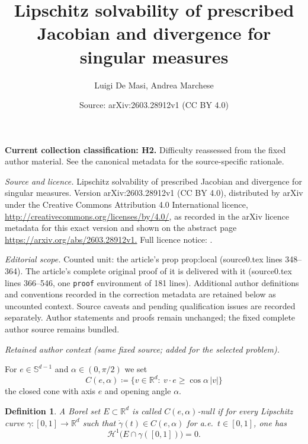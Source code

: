 \documentclass[10pt,a4paper]{amsart}
\title{Lipschitz solvability of prescribed Jacobian and divergence for singular measures}
\author{Luigi De Masi, Andrea Marchese}
\date{Source: arXiv:2603.28912v1 (CC BY 4.0)}
\newcommand{\R}{\mathbb{R}}
\newcommand{\HH}{\mathcal{H}}
\newtheorem{defn}{Definition}
\begin{document}
\maketitle
\par\medskip\noindent\textbf{Current collection classification: H2.} Difficulty reassessed from the fixed author material. See the canonical metadata for the source-specific rationale.\par\medskip


{\sloppy \noindent\emph{Source and licence.} Lipschitz solvability of prescribed Jacobian and divergence for singular measures. Version arXiv:2603.28912v1 (CC BY 4.0), distributed by arXiv under the Creative Commons Attribution 4.0 International licence, \url{http://creativecommons.org/licenses/by/4.0/}, as recorded in the arXiv licence metadata for this exact version and shown on the abstract page \url{https://arxiv.org/abs/2603.28912v1.} Full licence notice: .\par\smallskip\par}

\noindent\textit{Editorial scope.} Counted unit: the article's prop prop:local (source0.tex lines 348--364). The article's complete original proof of it is delivered with it (source0.tex lines 366--546, one \texttt{proof} environment of 181 lines). Additional author definitions and conventions recorded in the correction metadata are retained below as uncounted context. Source caveats and pending qualification issues are recorded separately. Author statements and proofs remain unchanged; the fixed complete author source remains bundled.\par\medskip
\par\medskip\noindent\textit{Retained author context (same fixed source; added for the selected problem).}\par
For $e\in \mathbb{S}^{d-1}$ and $\alpha\in(0,\pi/2)$ we set
$$
C(e,\alpha)\coloneqq \{v\in\R^d:\ v\cdot e\ge \cos\alpha\,|v|\}
$$
the closed cone with axis $e$ and opening angle $\alpha$.

\begin{defn}
A Borel set $E\subset\R^d$ is called \emph{$C(e,\alpha)$-null} if for every Lipschitz curve $\gamma:[0,1]\to\R^d$ such that $\dot\gamma(t)\in C(e,\alpha)$ for a.e.\ $t \in [0,1]$, one has
$$
\HH^1\bigl(E\cap \gamma([0,1])\bigr)=0.
$$
\end{defn}
\end{document}
